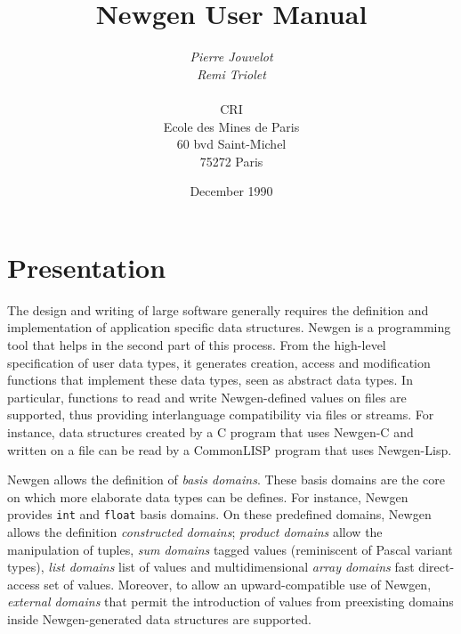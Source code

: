 
\title{Newgen User Manual}
\author{{\em Pierre Jouvelot}\\
        {\em Remi Triolet}\\
        \\
        CRI\\
        Ecole des Mines de Paris\\
        60 bvd Saint-Michel\\
        75272 Paris}

\date{December 1990}



\maketitle

\section{Presentation}

The design and writing of large software generally requires the
definition and implementation of application specific data structures.
Newgen is a programming tool that helps in the second part of this
process. From the high-level specification of user data types, it
generates creation, access and modification functions that implement
these data types, seen as abstract data types. In particular, functions
to read and write Newgen-defined values on files are supported, thus
providing interlanguage compatibility via files or streams. For 
instance, data structures created by a C program that uses Newgen-C
and written on a file can be read by a CommonLISP program that uses
Newgen-Lisp.

Newgen allows the definition of {\em basis domains}. These basis domains
are the core on which more elaborate data types can be defines. For
instance, Newgen provides {\tt int} and {\tt float} basis domains. On
these predefined domains, Newgen allows the definition {\em constructed
domains}; {\em product domains} allow the manipulation of tuples, {\em
sum domains} tagged values (reminiscent of Pascal variant types), {\em
list domains} list of values and multidimensional {\em array domains}
fast direct-access set of values. Moreover, to allow an
upward-compatible use of Newgen, {\em external domains} that permit the
introduction of values from preexisting domains inside Newgen-generated
data structures are supported.


